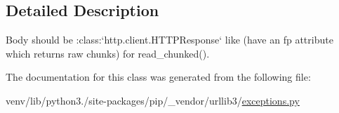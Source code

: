 \subsection{Detailed Description}
\begin{DoxyVerb}Body should be :class:`http.client.HTTPResponse` like
(have an fp attribute which returns raw chunks) for read_chunked().
\end{DoxyVerb}
 

The documentation for this class was generated from the following file\+:\begin{DoxyCompactItemize}
\item 
venv/lib/python3./site-\/packages/pip/\+\_\+vendor/urllib3/\hyperlink{pip_2__vendor_2urllib3_2exceptions_8py}{exceptions.\+py}\end{DoxyCompactItemize}
